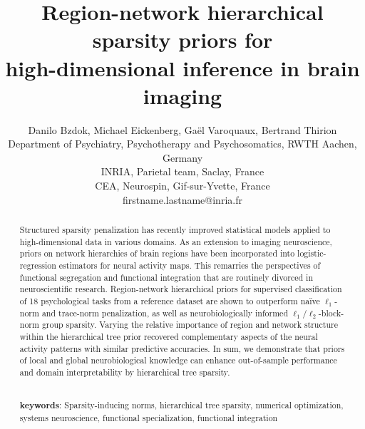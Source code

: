\documentclass{article} %
\title{Region-network hierarchical sparsity priors for\\
high-dimensional inference in brain imaging}
\begin{document}
\author{Danilo Bzdok, Michael Eickenberg,
  Ga\"el Varoquaux, Bertrand Thirion\\
  Department of Psychiatry, Psychotherapy and Psychosomatics, RWTH Aachen, Germany\\
  INRIA, Parietal team, Saclay, France\\
  CEA, Neurospin, Gif-sur-Yvette, France\\
  firstname.lastname@inria.fr}

\maketitle

\begin{abstract}
Structured sparsity penalization has recently improved
statistical models applied to high-dimensional data in various domains.
As an extension to imaging neuroscience,
priors on network hierarchies of brain regions have been incorporated into
logistic-regression estimators for neural activity maps.
This remarries the perspectives of
functional segregation and functional integration
that are routinely divorced in neuroscientific research.
%
Region-network hierarchical priors for supervised classification
of 18 psychological tasks
from a reference dataset are
shown to outperform na\"ive $\ell_1$-norm and
trace-norm penalization, as well as neurobiologically
informed $\ell_1/\ell_2$-block-norm group sparsity.
Varying the relative importance of
region and network structure within the hierarchical tree prior
recovered complementary aspects of the neural activity patterns
with similar predictive accuracies.
%
In sum,
we demonstrate that priors of local and global neurobiological knowledge can enhance
out-of-sample performance and domain interpretability
by hierarchical tree sparsity.



\textbf{\\keywords}:
Sparsity-inducing norms, hierarchical tree sparsity,
numerical optimization,
systems neuroscience,
functional specialization, functional integration

\end{abstract}
\end{document}

